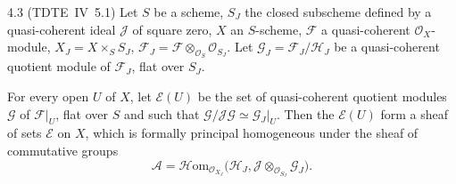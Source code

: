 \begin{proposition}{4.3}\label{III.4.3}
(TDTE~IV~5.1) Let \(S\) be a scheme, \(S_{J}\) the closed subscheme defined
by a quasi-coherent ideal \(\mathcal{J}\) of square zero, \(X\) an
\(S\)-scheme, \(\mathcal{F}\) a quasi-coherent \(\mathcal{O}_{X}\)-module,
\(X_{J}=X\times_{S}S_{J}\),
\(\mathcal{F}_{J}=\mathcal{F}\otimes_{\mathcal{O}_{S}}\mathcal{O}_{S_{J}}\).
Let \(\mathcal{G}_{J}=\mathcal{F}_{J}/\mathcal{H}_{J}\) be a quasi-coherent
quotient module of \(\mathcal{F}_{J}\), flat over \(S_{J}\).

For every open \(U\) of \(X\), let \(\mathcal{E}(U)\) be the set of
quasi-coherent quotient modules \(\mathcal{G}\)%
{\renewcommand{\thefootnote}{(77)}}
of \(\mathcal{F}|_{U}\), flat over \(S\) and such that
\(\mathcal{G}/\mathcal{J}\mathcal{G}\simeq\mathcal{G}_{J}|_{U}\). Then the
\(\mathcal{E}(U)\) form a sheaf of sets \(\mathcal{E}\) on \(X\), which is
formally principal homogeneous under the sheaf of commutative groups
\[
\mathcal{A}
  =\mathcal{H}\mathrm{om}_{\mathcal{O}_{X_{J}}}\bigl(\mathcal{H}_{J},
    \mathcal{J}\otimes_{\mathcal{O}_{S_{J}}}\mathcal{G}_{J}\bigr).
\]
\end{proposition}

